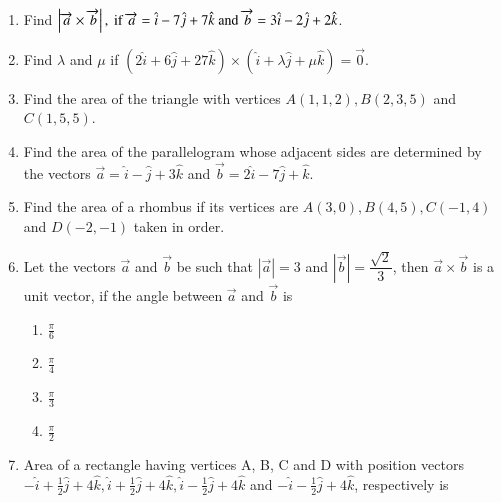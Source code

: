 \begin{enumerate}[label=\thesubsection.\arabic*,ref=\thesubsection.\theenumi]
		\item Find $\left\vert\overrightarrow{a}\times\overrightarrow{b}\right\vert,\text{ if }\overrightarrow{a}=\hat{i}-7\hat{j}+7\hat{k}\text{ and } \overrightarrow{b}=3\hat{i}-2\hat{j}+2\hat{k}$.
	\\
		\solution
		
\item Find $\lambda$ and $\mu$ if $(2\hat{i}+6\hat{j}+27\hat{k})\times(\hat{i}+\lambda \hat{j} + \mu \hat{k})=\overrightarrow{0}$.
	\\
		\solution
		
\item Find the area of the triangle with vertices $A(1, 1, 2), B(2, 3, 5)$ and $C(1, 5, 5)$.
	\\
		\solution
		
\item Find the area of the parallelogram whose adjacent sides are determined by the vectors $\overrightarrow{a}=\hat{i}-\hat{j}+3\hat{k}$ and $\overrightarrow{b}=2\hat{i}-7\hat{j}+\hat{k}$.
	\\
		\solution
		
\item Find the area of a rhombus if its vertices are $A(3,0), B(4,5), C(-1,4)$  and  $D(-2,-1)$ taken in order. 
	\\
		\solution
	
\item Let the vectors $\overrightarrow{a}$ and $\overrightarrow{b}$ be such that $|\overrightarrow{a}| = 3$ and $|\overrightarrow{b}| = \dfrac{\sqrt{2}}{3}$, then $\overrightarrow{a} \times \overrightarrow{b}$ is a unit vector, if the angle between $\overrightarrow{a}$ and $\overrightarrow{b}$ is
\begin{enumerate}
\item $\frac{\pi}{6}$
\item $\frac{\pi}{4}$
\item $\frac{\pi}{3}$
\item $\frac{\pi}{2}$
\end{enumerate}
		\solution
		
\item Area of a rectangle having vertices A, B, C and D with position vectors $ -\hat{i}+ \frac{1}{2} \hat{j}+4\hat{k}, \hat{i}+ \frac{1}{2} \hat{j}+4\hat{k}, \hat{i}-\frac{1}{2} \hat{j}+4\hat{k}$ and $-\hat{i}- \frac{1}{2} \hat{j}+4\hat{k}$, respectively is
\begin{enumerate}

\end{enumerate}
\end{enumerate}
